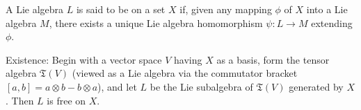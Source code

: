 A Lie algebra $L$ is said to be  on a set $X$ if, given any mapping $\phi$ of $X$ into a Lie algebra $M$, there exists a unique Lie algebra homomorphism $\psi: L \to M$ extending $\phi$.

Existence: Begin with a vector space $V$ having $X$ as a basis, form the tensor algebra $\mathfrak{T}(V)$ (viewed as a Lie algebra via the commutator bracket $[a,b] = a \otimes b - b \otimes a$), and let $L$ be the Lie subalgebra of $\mathfrak{T}(V)$ generated by $X$. Then $L$ is free on $X$.
